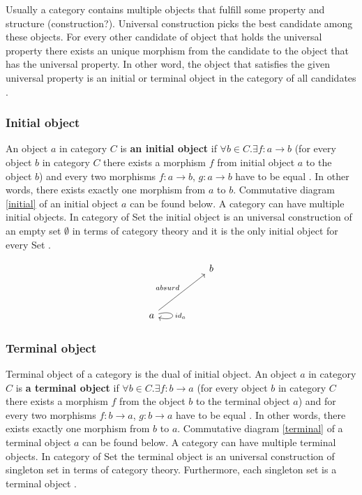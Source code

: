 \documentclass[article]{aaltoseries}
\begin{document}
    Usually a category contains multiple objects that fulfill some property and
    structure (construction?). Universal construction picks the best candidate among
    these objects. For every other candidate of object that holds the universal
    property there exists an unique morphism from the candidate to the object that
    has the universal property. In other word, the object that satisfies the given
    universal property is an initial or terminal object in the category of all
    candidates \cite{pierce1991basic}.
  

  \subsubsection{Initial object}
    An object $a$ in category $C$ is \textbf{an initial object} if $\forall b \in
    C. \exists f: a \rightarrow b$ (for every object $b$ in category $C$ there
    exists a morphism $f$ from initial object $a$ to the object $b$) and every
    two morphisms $f: a \rightarrow b$, $g: a \rightarrow b$ have to be
    equal \cite{barr1990category, pierce1991basic}. In other words, there exists
    exactly one morphism from $a$ to $b$. Commutative diagram \ref{initial} of an initial
    object $a$ can be found below. A category can have multiple initial
    objects. In category of Set the initial object is an universal construction
    of an empty set $\emptyset$ in terms of category theory and it is the only initial
    object for every Set \cite{barr1990category, pierce1991basic}.

    \begin{equation}
      \label{initial}
      \begin{tikzcd}[row sep=huge, column sep=huge]
        & b \\
        a \arrow[ur, "absurd"]
        \arrow[loop right, distance=2em, "id_{a}"]
        & 
      \end{tikzcd}
    \end{equation}


  \subsubsection{Terminal object}
    Terminal object of a category is the dual of initial object. An object $a$
    in category $C$ is \textbf{a terminal object} if $\forall b \in C. \exists
    f: b \rightarrow a$ (for every object $b$ in category $C$ there exists a
    morphism $f$ from the object $b$ to the terminal object $a$) and for every
    two morphisms $f: b \rightarrow a$, $g: b \rightarrow a$ have to be equal
    \cite{barr1990category, pierce1991basic}. In other words, there exists
    exactly one morphism from $b$ to $a$. Commutative diagram \ref{terminal} of
    a terminal object $a$ can be found below. A category can have multiple terminal
    objects. In category of Set the terminal object is an universal construction
    of singleton set in terms of category theory. Furthermore, each singleton
    set is a terminal object \cite{barr1990category, pierce1991basic}.
\end{document}

